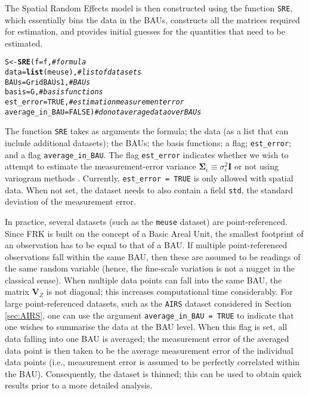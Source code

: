 \documentclass{article}\usepackage[]{graphicx}\usepackage[]{color}
\makeatletter
\newcommand{\hlnum}[1]{\textcolor[rgb]{0.686,0.059,0.569}{#1}}%
\newcommand{\hlcom}[1]{\textcolor[rgb]{0.678,0.584,0.686}{\textit{#1}}}%
\newcommand{\hlstd}[1]{\textcolor[rgb]{0.345,0.345,0.345}{#1}}%
\newcommand{\hlkwb}[1]{\textcolor[rgb]{0.69,0.353,0.396}{#1}}%
\newcommand{\hlkwc}[1]{\textcolor[rgb]{0.333,0.667,0.333}{#1}}%
\newcommand{\hlkwd}[1]{\textcolor[rgb]{0.737,0.353,0.396}{\textbf{#1}}}%
\newenvironment{kframe}{%
 \def\at@end@of@kframe{}%
 \ifinner\ifhmode%
  \def\at@end@of@kframe{\end{minipage}}%
  \begin{minipage}{\columnwidth}%
 \fi\fi%
 \def\FrameCommand##1{\hskip\@totalleftmargin \hskip-\fboxsep
 \colorbox{shadecolor}{##1}\hskip-\fboxsep
     \hskip-\linewidth \hskip-\@totalleftmargin \hskip\columnwidth}%
 \MakeFramed {\advance\hsize-\width
   \@totalleftmargin\z@ \linewidth\hsize
   \@setminipage}}%
 {\par\unskip\endMakeFramed%
 \at@end@of@kframe}
\newenvironment{knitrout}{}{} %
\renewcommand{\tt} {\texttt}
\newcommand{\pkg}[1]{{\fontseries{b}\selectfont #1}}
\newcommand{\Sigmamat} {{\bm \Sigma}}
\newcommand{\Imat} {\textbf{I}}
\newcommand{\Vmat} {\textbf{V}}
\makeatother
\begin{document}
\noindent The Spatial Random Effects model is then constructed using the function \tt{SRE}, which essentially bins the data in the BAUs, constructs all the matrices required for estimation, and provides initial guesses for the quantities that need to be estimated.


\begin{knitrout}
\color{fgcolor}\begin{kframe}
\begin{alltt}
\hlstd{S} \hlkwb{<-} \hlkwd{SRE}\hlstd{(}\hlkwc{f} \hlstd{= f,}                  \hlcom{# formula}
         \hlkwc{data} \hlstd{=} \hlkwd{list}\hlstd{(meuse),}     \hlcom{# list of datasets}
         \hlkwc{BAUs} \hlstd{= GridBAUs1,}       \hlcom{# BAUs}
         \hlkwc{basis} \hlstd{= G,}              \hlcom{# basis functions}
         \hlkwc{est_error} \hlstd{=} \hlnum{TRUE}\hlstd{,}       \hlcom{# estimation measurement error}
         \hlkwc{average_in_BAU} \hlstd{=} \hlnum{FALSE}\hlstd{)} \hlcom{# do not average data over BAUs}
\end{alltt}


{\ttfamily\noindent\itshape\color{messagecolor}{\#\# Loading required namespace: gstat}}\end{kframe}
\end{knitrout}

\noindent The function \tt{SRE} takes as arguments the formula; the data (as a list that can include additional datasets); the BAUs; the basis functions; a flag; \tt{est\_error}; and a flag \tt{average\_in\_BAU}. The flag \tt{est\_error} indicates whether we wish to attempt to estimate the measurement-error variance $\Sigmamat_\epsilon \equiv \sigma^2_\epsilon\Imat$ or not using variogram methods \citep{Kang_2009}. Currently, \tt{est\_error = TRUE} is only allowed with spatial data. When not set, the dataset needs to also contain a field \tt{std}, the standard deviation of the measurement error.

In practice, several datasets (such as the \tt{meuse} dataset) are point-referenced. Since \pkg{FRK} is built on the concept of a Basic Areal Unit, the smallest footprint of an observation has to be equal to that of a BAU. If multiple point-referenced observations fall within the same BAU, then these are assumed to be readings of the same random variable (hence, the fine-scale variation is not a nugget in the classical sense).  When multiple data points can fall into the same BAU, the matrix $\Vmat_Z$ is not diagonal; this increases computational time considerably. For large point-referenced datasets, such as the \tt{AIRS} dataset considered in Section \ref{sec:AIRS}, one can use the argument \tt{average\_in\_BAU = TRUE} to indicate that one wishes to summarise the data at the BAU level. When this flag is set, all data falling into one BAU is averaged; the measurement error of the averaged data point is then taken to be the average measurement error of the individual data points (i.e., measurement error is assumed to be perfectly correlated within the BAU). Consequently, the dataset is thinned; this can be used to obtain quick results prior to a more detailed analysis.
\end{document}
